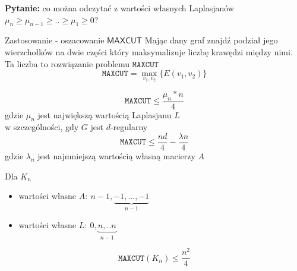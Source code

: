 \begin{problem*}
\textbf{Pytanie: } co można odczytać z wartości własnych Laplasjanów $\mu _n \geq \mu _{n-1}\geq ..\geq \mu _1 \geq 0$?

Zastosowanie - oszacowanie $\mathsf{MAX CUT}$ \newline
Mając dany graf znajdź podział jego wierzchołków na dwie części który maksymalizuje liczbę krawędzi między nimi.\\ Ta liczba to rozwiązanie problemu $\mathtt{MAX CUT}$
$$\mathtt{MAX CUT}=\max _{v_1, v_2}\{E(v_1,v_2)\}$$
\end{problem*}
\begin{theorem}
$$\mathtt{MAX CUT}\leq \frac{\mu _n*n}{4}$$ gdzie $\mu _n$ jest największą wartością Laplasjanu $L$\\
w szczególności, gdy $G$ jest $d$-regularny
$$ \mathtt{MAX CUT}\leq \frac{nd}{4}-\frac{\lambda n}{4}$$ gdzie $\lambda _n$ jest najmniejszą wartością własną macierzy $A$
\end{theorem}

\begin{remark}
Dla $K_n$
\begin{itemize}[label=$\rightarrow$]
\item wartości własne $A:\ n-1, \underbrace{-1,...,-1}_{n-1}$
\item wartości własne $L:\ 0, \underbrace{n,..n}_{n-1}$
\end{itemize}
$$\mathtt{MAX CUT}(K_n)\leq \frac{n^2}{4}$$
\end{remark}

